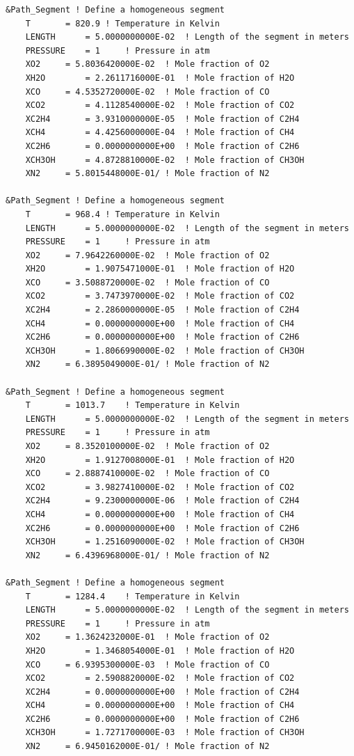 \begin{lstlisting}
&Path_Segment ! Define a homogeneous segment
	T		= 820.9	! Temperature in Kelvin
	LENGTH		= 5.0000000000E-02	! Length of the segment in meters
	PRESSURE	= 1		! Pressure in atm
	XO2		= 5.8036420000E-02	! Mole fraction of O2
	XH2O		= 2.2611716000E-01	! Mole fraction of H2O
	XCO		= 4.5352720000E-02	! Mole fraction of CO
	XCO2		= 4.1128540000E-02	! Mole fraction of CO2
	XC2H4		= 3.9310000000E-05	! Mole fraction of C2H4
	XCH4		= 4.4256000000E-04	! Mole fraction of CH4
	XC2H6		= 0.0000000000E+00	! Mole fraction of C2H6
	XCH3OH		= 4.8728810000E-02	! Mole fraction of CH3OH
	XN2		= 5.8015448000E-01/	! Mole fraction of N2

&Path_Segment ! Define a homogeneous segment
	T		= 968.4	! Temperature in Kelvin
	LENGTH		= 5.0000000000E-02	! Length of the segment in meters
	PRESSURE	= 1		! Pressure in atm
	XO2		= 7.9642260000E-02	! Mole fraction of O2
	XH2O		= 1.9075471000E-01	! Mole fraction of H2O
	XCO		= 3.5088720000E-02	! Mole fraction of CO
	XCO2		= 3.7473970000E-02	! Mole fraction of CO2
	XC2H4		= 2.2860000000E-05	! Mole fraction of C2H4
	XCH4		= 0.0000000000E+00	! Mole fraction of CH4
	XC2H6		= 0.0000000000E+00	! Mole fraction of C2H6
	XCH3OH		= 1.8066990000E-02	! Mole fraction of CH3OH
	XN2		= 6.3895049000E-01/	! Mole fraction of N2

&Path_Segment ! Define a homogeneous segment
	T		= 1013.7	! Temperature in Kelvin
	LENGTH		= 5.0000000000E-02	! Length of the segment in meters
	PRESSURE	= 1		! Pressure in atm
	XO2		= 8.3520100000E-02	! Mole fraction of O2
	XH2O		= 1.9127008000E-01	! Mole fraction of H2O
	XCO		= 2.8887410000E-02	! Mole fraction of CO
	XCO2		= 3.9827410000E-02	! Mole fraction of CO2
	XC2H4		= 9.2300000000E-06	! Mole fraction of C2H4
	XCH4		= 0.0000000000E+00	! Mole fraction of CH4
	XC2H6		= 0.0000000000E+00	! Mole fraction of C2H6
	XCH3OH		= 1.2516090000E-02	! Mole fraction of CH3OH
	XN2		= 6.4396968000E-01/	! Mole fraction of N2

&Path_Segment ! Define a homogeneous segment
	T		= 1284.4	! Temperature in Kelvin
	LENGTH		= 5.0000000000E-02	! Length of the segment in meters
	PRESSURE	= 1		! Pressure in atm
	XO2		= 1.3624232000E-01	! Mole fraction of O2
	XH2O		= 1.3468054000E-01	! Mole fraction of H2O
	XCO		= 6.9395300000E-03	! Mole fraction of CO
	XCO2		= 2.5908820000E-02	! Mole fraction of CO2
	XC2H4		= 0.0000000000E+00	! Mole fraction of C2H4
	XCH4		= 0.0000000000E+00	! Mole fraction of CH4
	XC2H6		= 0.0000000000E+00	! Mole fraction of C2H6
	XCH3OH		= 1.7271700000E-03	! Mole fraction of CH3OH
	XN2		= 6.9450162000E-01/	! Mole fraction of N2


\end{lstlisting}
